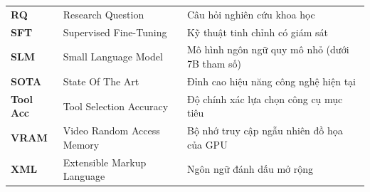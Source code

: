 \begin{table}[htbp]
\begin{tabular}{lll}
        \textbf{RQ} & Research Question & Câu hỏi nghiên cứu khoa học \\
        \textbf{SFT} & Supervised Fine-Tuning & Kỹ thuật tinh chỉnh có giám sát \\
        \textbf{SLM} & Small Language Model & Mô hình ngôn ngữ quy mô nhỏ (dưới 7B tham số) \\
        \textbf{SOTA} & State Of The Art & Đỉnh cao hiệu năng công nghệ hiện tại \\
        \textbf{Tool Acc} & Tool Selection Accuracy & Độ chính xác lựa chọn công cụ mục tiêu \\
        \textbf{VRAM} & Video Random Access Memory & Bộ nhớ truy cập ngẫu nhiên đồ họa của GPU \\
        \textbf{XML} & Extensible Markup Language & Ngôn ngữ đánh dấu mở rộng \\
        \bottomrule
    \end{tabular}
\end{table}


\newpage
